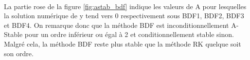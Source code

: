         \paragraph{}
        La partie rose de la figure \ref{fig:astab_bdf} indique les valeurs de A pour lesquelles la solution numérique de y tend vers 0 respectivement sous BDF1, BDF2, BDF3 et BDF4. On remarque donc que la méthode BDF est inconditionnellement A-Stable pour un ordre inférieur ou égal à 2 et conditionnellement stable sinon. Malgré cela, la méthode BDF reste plus stable que la méthode RK quelque soit son ordre.

